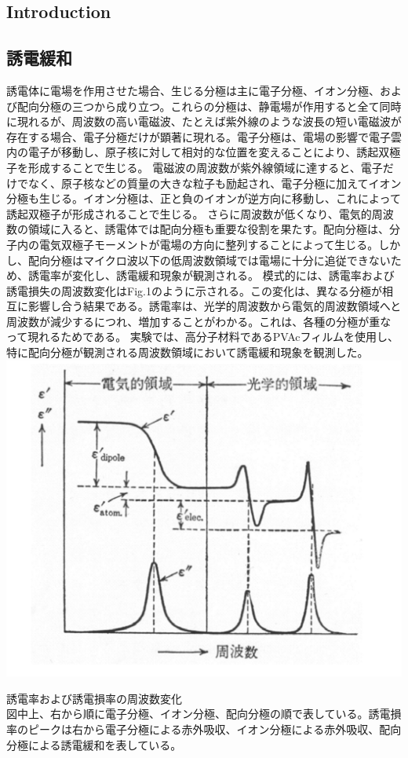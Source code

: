 \documentclass[a4paper,10pt]{jsarticle}
\makeatletter
\newenvironment{figurehere}
{\def\@captype{figure}}
{}
\makeatother
\begin{document}
\begin{multicols}{2}
\section{\textrm{Introduction}}
\subsection{\textrm{誘電緩和}}
誘電体に電場を作用させた場合、生じる分極は主に電子分極、イオン分極、および配向分極の三つから成り立つ。これらの分極は、静電場が作用すると全て同時に現れるが、周波数の高い電磁波、たとえば紫外線のような波長の短い電磁波が存在する場合、電子分極だけが顕著に現れる。電子分極は、電場の影響で電子雲内の電子が移動し、原子核に対して相対的な位置を変えることにより、誘起双極子を形成することで生じる。
電磁波の周波数が紫外線領域に達すると、電子だけでなく、原子核などの質量の大きな粒子も励起され、電子分極に加えてイオン分極も生じる。イオン分極は、正と負のイオンが逆方向に移動し、これによって誘起双極子が形成されることで生じる。
さらに周波数が低くなり、電気的周波数の領域に入ると、誘電体では配向分極も重要な役割を果たす。配向分極は、分子内の電気双極子モーメントが電場の方向に整列することによって生じる。しかし、配向分極はマイクロ波以下の低周波数領域では電場に十分に追従できないため、誘電率が変化し、誘電緩和現象が観測される。
模式的には、誘電率および誘電損失の周波数変化はFig.1のように示される。この変化は、異なる分極が相互に影響し合う結果である。誘電率は、光学的周波数から電気的周波数領域へと周波数が減少するにつれ、増加することがわかる。これは、各種の分極が重なって現れるためである。
実験では、高分子材料であるPVAcフィルムを使用し、特に配向分極が観測される周波数領域において誘電緩和現象を観測した。\\

\begin{figurehere}
\centering
\includegraphics[width=1\linewidth]{fig/Diagram.pdf}
\caption{誘電率および誘電損率の周波数変化\\図中上、右から順に電子分極、イオン分極、配向分極の順で表している。誘電損率のピークは右から電子分極による赤外吸収、イオン分極による赤外吸収、配向分極による誘電緩和を表している。}
\label{fig:diagram}
\end{figurehere}

\end{multicols}
\end{document}
